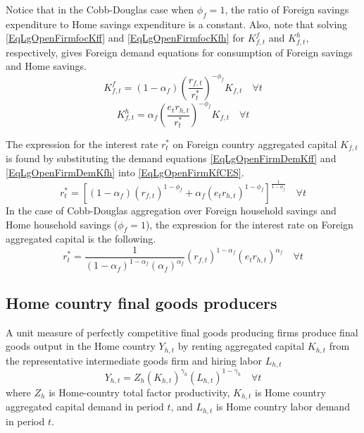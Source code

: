 \documentclass[letterpaper,12pt]{article}
\theoremstyle{definition}
\begin{document}
    Notice that in the Cobb-Douglas case when $\phi_f=1$, the ratio of Foreign savings expenditure to Home savings expenditure is a constant. Also, note that solving \eqref{EqLgOpenFirmfocKff} and \eqref{EqLgOpenFirmfocKfh} for $K^f_{f,t}$ and $K^h_{f,t}$, respectively, gives Foreign demand equations for consumption of Foreign savings and Home savings.
    \begin{equation}\label{EqLgOpenFirmDemKff}
      K^f_{f,t} = (1-\alpha_f)\left(\frac{r_{f,t}}{r^*_t}\right)^{-\phi_f}K_{f,t} \quad\forall t
    \end{equation}
    \begin{equation}\label{EqLgOpenFirmDemKfh}
      K^h_{f,t} = \alpha_f \left(\frac{e_t r_{h,t}}{r^*_t}\right)^{-\phi_f}K_{f,t} \quad\forall t
    \end{equation}

    The expression for the interest rate $r^*_t$ on Foreign country aggregated capital $K_{f,t}$ is found by substituting the demand equations \eqref{EqLgOpenFirmDemKff} and \eqref{EqLgOpenFirmDemKfh} into \eqref{EqLgOpenFirmKfCES}.
    \begin{equation}\label{EqLgOpenFirmAggR_f}
      r^*_t = \left[(1-\alpha_f)\left(r_{f,t}\right)^{1-\phi_f} + \alpha_f \left(e_t r_{h,t}\right)^{1-\phi_f}\right]^{\frac{1}{1-\phi_f}} \quad\forall t
    \end{equation}
    In the case of Cobb-Douglas aggregation over Foreign household savings and Home household savings ($\phi_f=1$), the expression for the interest rate on Foreign aggregated capital is the following.
    \begin{equation}\label{EqLgOpenFirmAggR_f_Cobb}
      r^*_t = \frac{1}{(1-\alpha_f)^{1-\alpha_f}(\alpha_f)^{\alpha_f}} \left(r_{f,t}\right)^{1-\alpha_f}\left(e_t r_{h,t}\right)^{\alpha_f} \quad\forall t
    \end{equation}


  \subsection{Home country final goods producers}\label{SecLgOpenFirmFinal_H}

    A unit measure of perfectly competitive final goods producing firms produce final goods output in the Home country $Y_{h,t}$ by renting aggregated capital $K_{h,t}$ from the representative intermediate goods firm and hiring labor $L_{h,t}$
    \begin{equation}\label{EqLgOpenProdFunc_H}
      Y_{h,t} = Z_h \left(K_{h,t}\right)^{\gamma_h}\left(L_{h,t}\right)^{1-\gamma_h} \quad\forall t
    \end{equation}
    where $Z_h$ is Home-country total factor productivity, $K_{h,t}$ is Home country aggregated capital demand in period $t$, and $L_{h,t}$ is Home country labor demand in period $t$.
\end{document}
